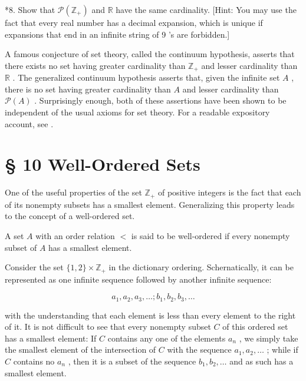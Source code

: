 *8. Show that \(\mathcal{P}\left( {\mathbb{Z}}_{ + }\right)\) and \(\mathbb{R}\) have the same cardinality. [Hint: You may use the fact that every real number has a decimal expansion, which is unique if expansions that end in an infinite string of 9 ’s are forbidden.]

A famous conjecture of set theory, called the continuum hypothesis, asserts that there exists no set having greater cardinality than \({\mathbb{Z}}_{ + }\) and lesser cardinality than \(\mathbb{R}\) . The generalized continuum hypothesis asserts that, given the infinite set \(A\) , there is no set having greater cardinality than \(A\) and lesser cardinality than \(\mathcal{P}\left( A\right)\) . Surprisingly enough, both of these assertions have been shown to be independent of the usual axioms for set theory. For a readable expository account, see \cite{Smullyan1969}.

\section*{§ 10 Well-Ordered Sets}

One of the useful properties of the set \({\mathbb{Z}}_{ + }\) of positive integers is the fact that each of its nonempty subsets has a smallest element. Generalizing this property leads to the concept of a well-ordered set.

\begin{definition} A set \(A\) with an order relation \(<\) is said to be well-ordered if every nonempty subset of \(A\) has a smallest element.
\end{definition}

\begin{centeredblock}
\begin{example} Consider the set \(\{ 1,2\}  \times  {\mathbb{Z}}_{ + }\) in the dictionary ordering. Schernatically, it can be represented as one infinite sequence followed by another infinite sequence:

\[
{a}_{1},{a}_{2},{a}_{3},\ldots ;{b}_{1},{b}_{2},{b}_{3},\ldots
\]

with the understanding that each element is less than every element to the right of it. It is not difficult to see that every nonempty subset \(C\) of this ordered set has a smallest element: If \(C\) contains any one of the elements \({a}_{n}\) , we simply take the smallest element of the intersection of \(C\) with the sequence \({a}_{1},{a}_{2},\ldots\) ; while if \(C\) contains no \({a}_{n}\) , then it is a subset of the sequence \({b}_{1},{b}_{2},\ldots\) and as such has a smallest element.
\end{example}
\end{centeredblock}

